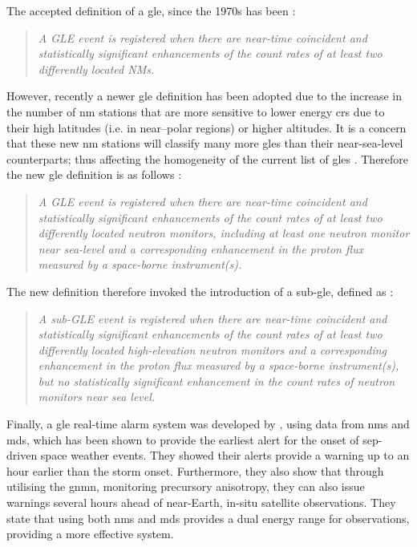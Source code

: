 The accepted definition of a \gls{gle}, since the 1970s has been \citep{poluianov_gle_2017}: 

\begin{quote}
	\textit{A GLE event is registered when there are near-time coincident and statistically significant enhancements of the count rates of at least two differently located NMs.}
\end{quote}

However, recently a newer \gls{gle} definition has been adopted due to the increase in the number of \gls{nm} stations that are more sensitive to lower energy \glspl{cr} due to their high latitudes (i.e. in near--polar regions) or higher altitudes. It is a concern that these new \gls{nm} stations will classify many more \glspl{gle} than their near-sea-level counterparts; thus affecting the homogeneity of the current list of \glspl{gle} \citep{poluianov_gle_2017}. Therefore the new \gls{gle} definition is as follows \citep{poluianov_gle_2017}: 

\begin{quote}
	\textit{A GLE event is registered when there are near-time coincident and statistically significant enhancements of the count rates of at least two differently located neutron monitors, including at least one neutron monitor near sea-level and a corresponding enhancement in the proton flux measured by a space-borne instrument(s).}
\end{quote}

The new definition therefore invoked the introduction of a sub-\gls{gle}, defined as \citep{poluianov_gle_2017}:

\begin{quote}
	\textit{A sub-GLE event is registered when there are near-time coincident and statistically significant enhancements of the count rates of at least two differently located high-elevation neutron monitors and a corresponding enhancement in the proton flux measured by a space-borne instrument(s), but no statistically significant enhancement in the count rates of neutron monitors near sea level.}
\end{quote}


Finally, a \gls{gle} real-time alarm system was developed by \citet{kuwabara_real-time_2006, kuwabara_development_2006}, using data from \glspl{nm} and \glspl{md}, which has been shown to provide the earliest alert for the onset of \gls{sep}-driven space weather events. They showed their alerts provide a warning up to an hour earlier than the storm onset. Furthermore, they also show that through utilising the \gls{gnmn}, monitoring precursory anisotropy, they can also issue warnings several hours ahead of near-Earth, in-situ satellite observations. They state that using both \glspl{nm} and \glspl{md} provides a dual energy range for observations, providing a more effective system.


